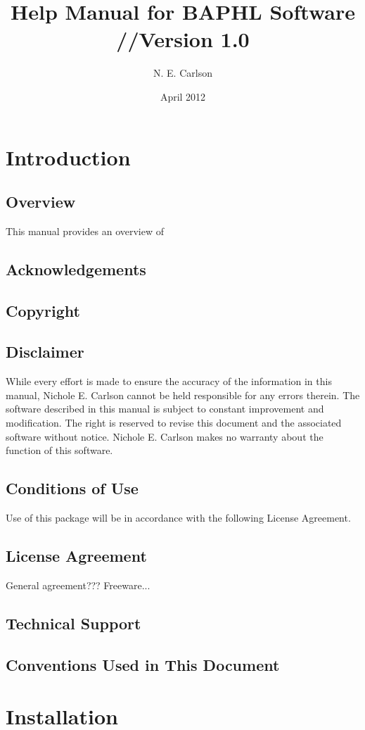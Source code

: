 \documentclass[11pt]{book}
\begin{document}
\author{N. E. Carlson}
\title{Help Manual for BAPHL Software //Version 1.0}
\date{April 2012}

\frontmatter
\tableofcontents
\chapter{Introduction}
\section{Overview}
This manual provides an overview of
\section{Acknowledgements}
\section{Copyright}

\section{Disclaimer}
    While every effort is made to ensure the accuracy of the information in this manual, Nichole E. Carlson cannot be held responsible for any errors therein. The software described in this manual is subject to constant improvement and modification.  The right is reserved to revise this document and the associated software without notice.  Nichole E. Carlson makes no warranty about the function of this software.
\section{Conditions of Use}
    Use of this package will be in accordance with the following License Agreement.
\section{License Agreement}
    General agreement??? Freeware...
\section{Technical Support}
\section{Conventions Used in This Document}

\chapter{Installation}
\end{document}
